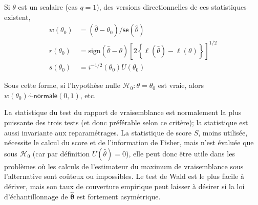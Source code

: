 \documentclass[
  11pt,
  letterpaper,
]{scrbook}
\theoremstyle{definition}
\theoremstyle{plain}
\theoremstyle{definition}
\theoremstyle{plain}
\theoremstyle{remark}
\begin{document}
Si \(\theta\) est un scalaire (cas \(q=1\)), des versions
directionnelles de ces statistiques existent, \begin{align*}
w(\theta_0)&=(\widehat{\theta}-\theta_0)/\mathsf{se}(\widehat{\theta})  \\
r({\theta_0}) &= \mathrm{sign}(\widehat{\theta}-\theta)\left[2
\left\{\ell(\widehat{\theta})-\ell(\theta)\right\}\right]^{1/2}  \\
s(\theta_0)&=i^{-1/2}(\theta_0)U(\theta_0) 
\end{align*}

Sous cette forme, si l'hypothèse nulle
\(\mathscr{H}_0: \theta = \theta_0\) est vraie, alors
\(w(\theta_0)\stackrel{\cdot}{\sim} \mathsf{normale}(0,1)\), etc.

La statistique du test du rapport de vraisemblance est normalement la
plus puissante des trois tests (et donc préférable selon ce critère); la
statistique est aussi invariante aux reparamétrages. La statistique de
score \(S\), moins utilisée, nécessite le calcul du score et de
l'information de Fisher, mais n'est évaluée que sous \(\mathscr{H}_0\)
(car par définition \(U(\widehat{\theta})=0\)), elle peut donc être
utile dans les problèmes où les calculs de l'estimateur du maximum de
vraisemblance sous l'alternative sont coûteux ou impossibles. Le test de
Wald est le plus facile à dériver, mais son taux de couverture empirique
peut laisser à désirer si la loi d'échantillonnage de
\(\widehat{\boldsymbol{\theta}}\) est fortement asymétrique.
\end{document}
